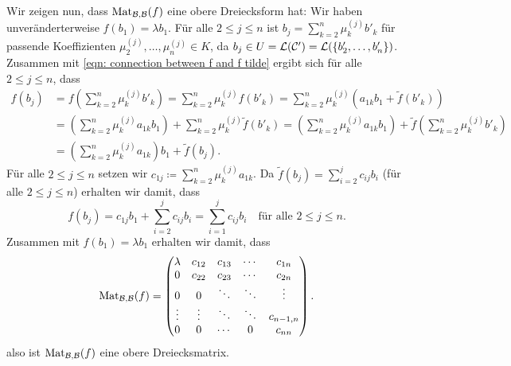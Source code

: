 \documentclass[a4paper,10pt]{scrartcl}
\begin{document}
Wir zeigen nun, dass $\mathrm{Mat}_{\mathcal{B},\mathcal{B}}(f)$ eine obere Dreiecksform hat: Wir haben unveränderterweise $f(b_1) = \lambda b_1$. Für alle $2 \leq j \leq n$ ist $b_j = \sum_{k=2}^n \mu^{(j)}_k b'_k$ für passende Koeffizienten $\mu^{(j)}_2, \dotsc, \mu^{(j)}_n \in K$, da $b_j \in U = \mathcal{L}(\mathcal{C'}) = \mathcal{L}(\{b'_2, \dotsc, b'_n\})$. Zusammen mit \eqref{eqn: connection between f and f tilde} ergibt sich für alle  $2 \leq j \leq n$, dass
\begin{align*}
 f(b_j)
 &= f\left( \sum_{k=2}^n \mu^{(j)}_k b'_k \right)
 = \sum_{k=2}^n \mu^{(j)}_k f(b'_k)
 = \sum_{k=2}^n \mu^{(j)}_k (a_{1k} b_1 + \tilde{f}(b'_k)) \\
 &= \left( \sum_{k=2}^n \mu^{(j)}_k a_{1k} b_1 \right) + \sum_{k=2}^n \mu^{(j)}_k \tilde{f}(b'_k)
 = \left( \sum_{k=2}^n \mu^{(j)}_k a_{1k} b_1 \right) + \tilde{f}\left( \sum_{k=2}^n \mu^{(j)}_k b'_k \right) \\
 &= \left( \sum_{k=2}^n \mu^{(j)}_k a_{1k} \right)b_1 + \tilde{f}\left( b_j \right).
\end{align*}
Für alle $2 \leq j \leq n$ setzen wir $c_{1j} \coloneqq \sum_{k=2}^n \mu^{(j)}_k a_{1k}$. Da $\tilde{f}(b_j) = \sum_{i=2}^j c_{ij} b_i$ (für alle $2 \leq j \leq n$) erhalten wir damit, dass
\[
 f(b_j)
 = c_{1j} b_1 + \sum_{i=2}^j c_{ij} b_i
 = \sum_{i=1}^j c_{ij} b_i
 \quad\text{für alle $2 \leq j \leq n$}.
\]
Zusammen mit $f(b_1) = \lambda b_1$ erhalten wir damit, dass
\[
 \mathrm{Mat}_{\mathcal{B},\mathcal{B}}(f)
 =
 \begin{pmatrix}
  \lambda & c_{12} & c_{13} & \cdots & c_{1n}    \\
  0       & c_{22} & c_{23} & \cdots & c_{2n}    \\
  0       & 0      & \ddots & \ddots & \vdots    \\
  \vdots  & \vdots & \ddots & \ddots & c_{n-1,n} \\
  0       & 0      & \cdots & 0      & c_{nn}
 \end{pmatrix}.
\]
also ist $\mathrm{Mat}_{\mathcal{B},\mathcal{B}}(f)$ eine obere Dreiecksmatrix.
\end{document}
